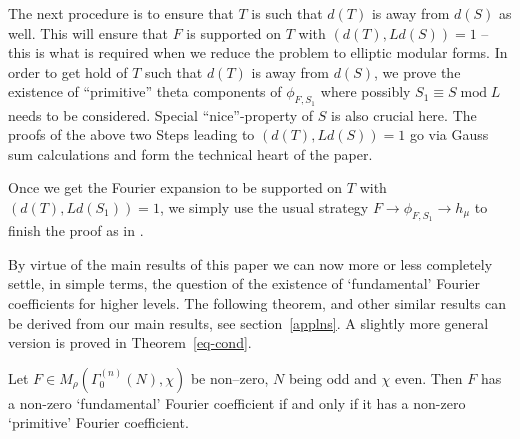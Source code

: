 \documentclass[11pt]{amsart}
\numberwithin{equation}{section}
\renewcommand*{\mod}{\operatorname{mod}}
\newcommand{\z}{\mathbb{Z}}
\begin{document}
The next procedure is to ensure that $T$ is such that $d(T)$ is away from $d(S)$ as well. This will ensure that $F$ is supported on $T$ with $(d(T), Ld(S))=1$ -- this is what is required when we reduce the problem to elliptic modular forms. In order to get hold of $T$  such that $d(T)$ is away from $d(S)$, we prove the existence of ``primitive'' theta components of $\phi_{F,S_1}$ where possibly $S_1 \equiv S \mod L$ needs to be considered. Special ``nice''-property of $S$ is also crucial here. The proofs of the above two Steps leading to 
$(d(T), Ld(S))=1$ go via Gauss sum calculations and form the technical heart of the paper.

Once we get the Fourier expansion to be supported on $T$ with $(d(T), Ld(S_1))=1$, we simply use the usual strategy $F \to \phi_{F,S_1} \to h_\mu$ to finish the proof as in \cite{boche-das}.








By virtue of the main results of this paper we can now more or less completely settle, in simple terms, the question of the existence of `fundamental' Fourier coefficients for higher levels. The following theorem, and other similar results can be derived from our main results, see section~\ref{applns}. A slightly more general version is proved in Theorem~\ref{eq-cond}.

\begin{theorem} \label{genres-intro}
    Let $F \in M_{\rho}(\Gamma_{0}^{(n)}(N), \chi)$ be non--zero,  $N$ being odd and $\chi$ even. Then $F$ has a non-zero `fundamental' Fourier coefficient if and only if it has a non-zero `primitive' Fourier coefficient. 
\end{theorem}
\end{document}
